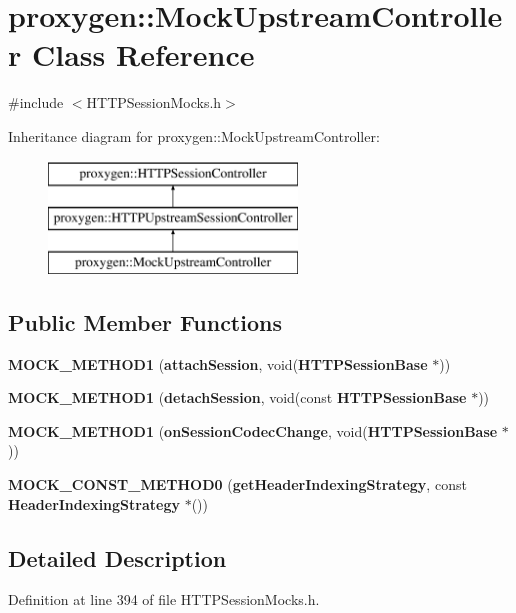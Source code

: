 \section{proxygen\+:\+:Mock\+Upstream\+Controller Class Reference}
\label{classproxygen_1_1MockUpstreamController}


{\ttfamily \#include $<$H\+T\+T\+P\+Session\+Mocks.\+h$>$}

Inheritance diagram for proxygen\+:\+:Mock\+Upstream\+Controller\+:\begin{figure}[H]
\begin{center}
\leavevmode
\includegraphics[height=3.000000cm]{classproxygen_1_1MockUpstreamController}
\end{center}
\end{figure}
\subsection*{Public Member Functions}
\begin{DoxyCompactItemize}
\item 
{\bf M\+O\+C\+K\+\_\+\+M\+E\+T\+H\+O\+D1} ({\bf attach\+Session}, void({\bf H\+T\+T\+P\+Session\+Base} $\ast$))
\item 
{\bf M\+O\+C\+K\+\_\+\+M\+E\+T\+H\+O\+D1} ({\bf detach\+Session}, void(const {\bf H\+T\+T\+P\+Session\+Base} $\ast$))
\item 
{\bf M\+O\+C\+K\+\_\+\+M\+E\+T\+H\+O\+D1} ({\bf on\+Session\+Codec\+Change}, void({\bf H\+T\+T\+P\+Session\+Base} $\ast$))
\item 
{\bf M\+O\+C\+K\+\_\+\+C\+O\+N\+S\+T\+\_\+\+M\+E\+T\+H\+O\+D0} ({\bf get\+Header\+Indexing\+Strategy}, const {\bf Header\+Indexing\+Strategy} $\ast$())
\end{DoxyCompactItemize}


\subsection{Detailed Description}


Definition at line 394 of file H\+T\+T\+P\+Session\+Mocks.\+h.




